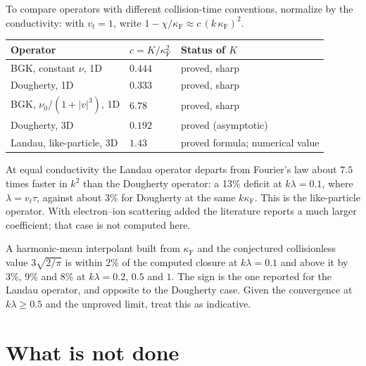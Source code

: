 \documentclass[11pt]{article}
\newcommand{\vt}{v_t}
\theoremstyle{remark}
\begin{document}
To compare operators with different collision-time conventions, normalize by
the conductivity: with $\vt=1$, write
$1-\chi/\kappa_{\mathrm F}\approx c\,(k\,\kappa_{\mathrm F})^2$.
\begin{center}
\renewcommand{\arraystretch}{1.25}
\begin{tabular}{llp{5.2cm}}
  Operator & $c = K/\kappa_{\mathrm F}^2$ & Status of $K$ \\ \hline
  BGK, constant $\nu$, 1D & $0.444$ & proved, sharp \\
  Dougherty, 1D & $0.333$ & proved, sharp \\
  BGK, $\nu_0/(1+|v|^3)$, 1D & $6.78$ & proved, sharp \\
  Dougherty, 3D & $0.192$ & proved (asymptotic) \\
  Landau, like-particle, 3D & $1.43$ & proved formula; numerical value \\
\end{tabular}
\end{center}
At equal conductivity the Landau operator departs from Fourier's law about
$7.5$ times faster in $k^2$ than the Dougherty operator: a 13\% deficit at
$k\lambda=0.1$, where $\lambda=\vt\tau$, against about 3\% for Dougherty at
the same $k\kappa_{\mathrm F}$. This is the like-particle operator. With
electron--ion scattering added the literature reports a much larger
coefficient; that case is not computed here.

A harmonic-mean interpolant built from $\kappa_{\mathrm F}$ and the
conjectured collisionless value $3\sqrt{2/\pi}$ is within 2\% of the
computed closure at $k\lambda=0.1$ and above it by 3\%, 9\% and 8\% at
$k\lambda=0.2$, $0.5$ and $1$. The sign is the one reported for the Landau
operator, and opposite to the Dougherty case. Given the convergence at
$k\lambda\ge0.5$ and the unproved limit, treat this as indicative.

\section{What is not done}
\end{document}
